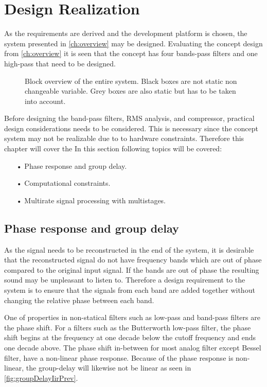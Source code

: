\chapter{Design Realization} \label{ch:designRealization}
As the requirements are derived and the development platform is chosen, the system presented in \autoref{ch:overview} may be designed. Evaluating the concept design from \autoref{ch:overview} it is seen that the concept has four bands-pass filters and one high-pass that need to be designed. 
\begin{figure}[H]
\centering
{}
\scalebox{0.8}{
}
\caption{Block overview of the entire system. Black boxes are not static non changeable variable. Grey boxes are also static but has to be taken into account.}
\label{fig:SystemOverview2}
\end{figure}
Before designing the band-pass filters, RMS analysis, and compressor, practical design considerations needs to be considered. This is necessary since the concept system may not be realizable due to to hardware constraints. Therefore this chapter will cover the In this section following topics will be covered:

\begin{itemize}
\item[•] Phase response and group delay.
\item[•] Computational constraints.
\item[•] Multirate signal processing with multistages.
\end{itemize}


\section{Phase response and group delay}
As the signal needs to be reconstructed in the end of the system, it is desirable that the reconstructed signal do not have frequency bands which are out of phase compared to the original input signal. If the bands are out of phase the resulting sound may be unpleasant to listen to. Therefore a design requirement to the system is to ensure that the signals from each band are added together without changing the relative phase between each band.

One of properties in non-statical filters such as low-pass and band-pass filters are the phase shift. For a filters such as the Butterworth low-pass filter, the phase shift begins at the frequency at one decade below the cutoff frequency and ends one decade above. The phase shift in-between for most analog filter except Bessel filter, have a non-linear phase response. Because of the phase response is non-linear, the group-delay will likewise not be linear as seen in \autoref{fig:groupDelayIirPrev}.

